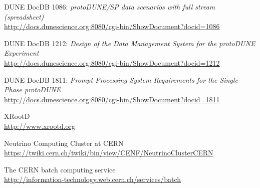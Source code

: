 \documentclass[pdftex,12pt,letter]{article}
\begin{document}
\clearpage
\begin{thebibliography}{1}
{DUNE DocDB 1086: \textit{ protoDUNE/SP data scenarios with full stream (spreadsheet)}}\\
\url{http://docs.dunescience.org:8080/cgi-bin/ShowDocument?docid=1086}





{DUNE DocDB 1212: \textit{Design of the Data Management System for the protoDUNE Experiment}}\\
\url{http://docs.dunescience.org:8080/cgi-bin/ShowDocument?docid=1212}

{DUNE DocDB 1811: \textit{Prompt Processing System Requirements for the Single-Phase protoDUNE}}\\
\url{http://docs.dunescience.org:8080/cgi-bin/ShowDocument?docid=1811}


{XRootD}\\
\url{http://www.xrootd.org}

{Neutrino Computing Cluster at CERN}\\
\url{https://twiki.cern.ch/twiki/bin/view/CENF/NeutrinoClusterCERN}

{The CERN batch computing service}\\
\url{http://information-technology.web.cern.ch/services/batch}

\end{thebibliography}
\end{document}
